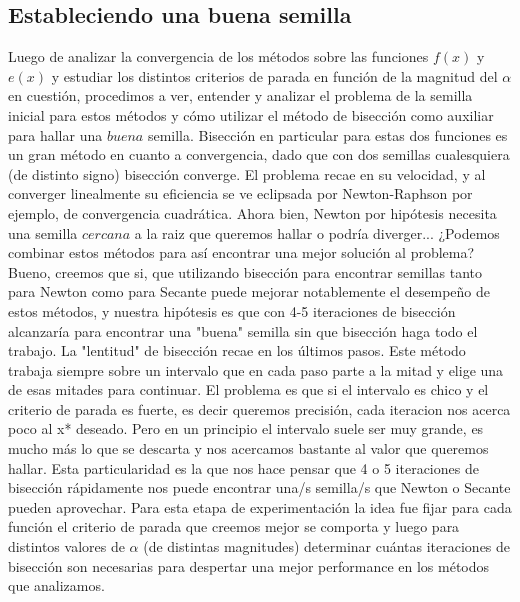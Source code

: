 \subsection{Estableciendo una buena semilla}

Luego de analizar la convergencia de los métodos sobre las funciones $f(x)$ y $e(x)$ y estudiar los distintos criterios de parada en función de la magnitud del $\alpha$ en cuestión, procedimos a ver, entender y analizar el problema de la semilla inicial para estos métodos y cómo utilizar el método de bisección como auxiliar para hallar una $buena$ semilla.
Bisección en particular para estas dos funciones es un gran método en cuanto a convergencia, dado que con dos semillas cualesquiera (de distinto signo) bisección converge. El problema recae en su velocidad, y al converger linealmente su eficiencia se ve eclipsada por Newton-Raphson por ejemplo, de convergencia cuadrática. Ahora bien, Newton por hipótesis necesita una semilla $cercana$ a la raiz que queremos hallar o podría diverger...
¿Podemos combinar estos métodos para así encontrar una mejor solución al problema?
Bueno, creemos que si, que utilizando bisección para encontrar semillas tanto para Newton como para Secante puede mejorar notablemente el desempeño de estos métodos, y nuestra hipótesis es que con 4-5 iteraciones de bisección alcanzaría para encontrar una "buena" semilla sin que bisección haga todo el trabajo.
La "lentitud" de bisección recae en los últimos pasos. Este método trabaja siempre sobre un intervalo que en cada paso parte a la mitad y elige una de esas mitades para continuar. El problema es que si el intervalo es chico y el criterio de parada es fuerte, es decir queremos precisión, cada iteracion nos acerca poco al x* deseado. Pero en un principio el intervalo suele ser muy grande, es mucho más lo que se descarta y nos acercamos bastante al valor que queremos hallar. Esta particularidad es la que nos hace pensar que 4 o 5 iteraciones de bisección rápidamente nos puede encontrar una/s semilla/s que Newton o Secante pueden aprovechar.
Para esta etapa de experimentación la idea fue fijar para cada función el criterio de parada que creemos mejor se comporta y luego para distintos valores de $\alpha$ (de distintas magnitudes) determinar cuántas iteraciones de bisección son necesarias para despertar una mejor performance en los métodos que analizamos.
